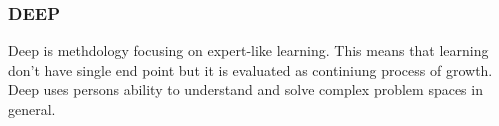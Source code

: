 \documentclass[english]{tktltiki2}
\theoremstyle{definition}
\theoremstyle{remark}
\begin{document}
\subsubsection{DEEP}

Deep is methdology focusing on expert-like learning. This means that learning don't have single end point but it is evaluated as continiung process of growth. Deep uses persons ability to understand and solve complex problem spaces in general.

%
%
% 
%







%
\end{document}
